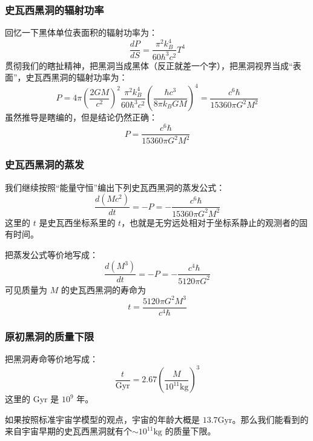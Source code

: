 \documentclass[CJK,13pt]{beamer}
\begin{document}
    \begin{frame}
      \frametitle{史瓦西黑洞的辐射功率}
      回忆一下黑体单位表面积的辐射功率为：
      $$\frac{dP}{dS} = \frac{\pi^2k_B^4}{60\hbar^3c^2} T^4$$
      贯彻我们的瞎扯精神，把黑洞当成黑体（反正就差一个字），把黑洞视界当成“表面”，史瓦西黑洞的辐射功率为：
      $$ P =  4\pi \left(\frac{2GM}{c^2}\right)^2 \frac{\pi^2k_B^4}{60\hbar^3c^2}  \left(\frac{\hbar c^3}{8\pi k_BGM}\right)^4 =\frac{c^6\hbar}{15360\pi G^2M^2}$$
      虽然推导是瞎编的，但是结论仍然正确：
      {\blue $$P = \frac{c^6\hbar}{15360\pi G^2M^2}$$}
    \end{frame}

    \begin{frame}
      \frametitle{史瓦西黑洞的蒸发}
      我们继续按照“能量守恒”编出下列史瓦西黑洞的蒸发公式：
      $$\frac{d\left(Mc^2\right)}{dt} = -P = - \frac{c^6\hbar}{15360\pi G^2M^2}$$
      这里的 $t$ 是史瓦西坐标系里的 $t$，也就是无穷远处相对于坐标系静止的观测者的固有时间。

      把蒸发公式等价地写成：
      $$\frac{d(M^3)}{dt} = -P = - \frac{c^4\hbar}{5120\pi G^2}$$
      可见质量为 $M$ 的史瓦西黑洞的寿命为
     {\blue $$t = \frac{5120\pi G^2M^3}{c^4\hbar}$$}      
    \end{frame}


    \begin{frame}
      \frametitle{原初黑洞的质量下限}
      把黑洞寿命等价地写成：
      $$\frac{t}{\mathrm{Gyr}} = 2.67 \left(\frac{M}{10^{11}\mathrm{kg}}\right)^3 $$
      这里的 $\mathrm{Gyr}$ 是 $10^9$ 年。

      \skiplines

      如果按照标准宇宙学模型的观点，宇宙的年龄大概是 $13.7\mathrm{Gyr}$。那么我们能看到的来自宇宙早期的史瓦西黑洞就有个$\sim 10^{11}\mathrm{kg}$ 的质量下限。
    \end{frame}    
    

    \ech
\end{document}

